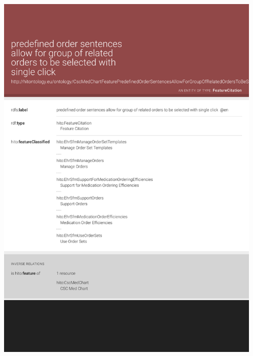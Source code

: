 \documentclass[aspectratio=1610,handout]{beamer}
\begin{document}
\begin{frame}[plain]
\begin{columns}
 \begin{column}{.55\textwidth}
  \centering\includegraphics[width=1.0\textwidth,height=1.0\textheight,keepaspectratio,trim=0 100 0 0,clip]{cscmedchart-lodview-feature.pdf}
 \end{column}
 \begin{column}{.55\textwidth}

\end{column}
\end{columns}
\end{frame}
\end{document}

